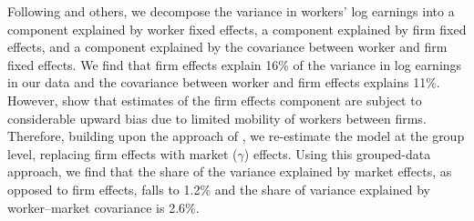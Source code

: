 \documentclass[12pt]{article}
\def\g{\gamma}
\theoremstyle{definition}
\theoremstyle{plain}
\begin{document}
Following \citet{BonhommeHolzheuLamadonManresaMogstadSetzler2020} and others, we decompose the variance in workers' log earnings into a component explained by worker fixed effects, a component explained by firm fixed effects, and a component explained by the covariance between worker and firm fixed effects. We find that firm effects explain 16\% of the variance in log earnings in our data and the covariance  between worker and firm effects explains 11\%. However, \citet{BonhommeHolzheuLamadonManresaMogstadSetzler2020} show that estimates of the firm effects component are subject to considerable upward bias due to limited mobility of workers between firms. Therefore, building upon the approach of \citet{BonhommeLamadonManresa2019_distributional,BonhommeLamadonManresa2019_discretizing}, we re-estimate the model at the group level, replacing firm effects with market ($\g$) effects. Using this grouped-data approach, we find that the share of the variance explained by market effects, as opposed to firm effects, falls to 1.2\% and the share of variance explained by worker--market covariance is 2.6\%.
\end{document}
